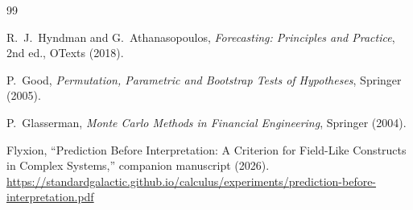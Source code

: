 \documentclass[11pt]{article}
\begin{document}
\begin{thebibliography}{99}

R.~J.~Hyndman and G.~Athanasopoulos,
\emph{Forecasting: Principles and Practice},
2nd ed., OTexts (2018).


P.~Good,
\emph{Permutation, Parametric and Bootstrap Tests of Hypotheses},
Springer (2005).


P.~Glasserman,
\emph{Monte Carlo Methods in Financial Engineering},
Springer (2004).


Flyxion,
``Prediction Before Interpretation: A Criterion for Field-Like Constructs in Complex Systems,''
companion manuscript (2026).
\url{https://standardgalactic.github.io/calculus/experiments/prediction-before-interpretation.pdf}

\end{thebibliography}
\end{document}
